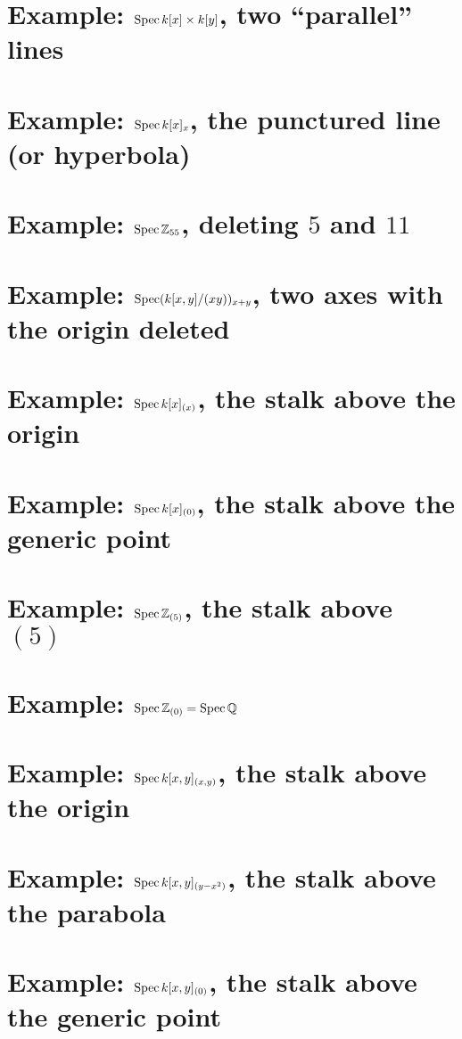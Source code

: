 \section{Example: $\operatorname{Spec} k[x] \times k[y]$, two ``parallel'' lines}

\section{Example: $\operatorname{Spec} k[x]_x$, the punctured line (or hyperbola)}
\section{Example: $\operatorname{Spec} \mathbb Z_{55}$, deleting $5$ and $11$}

\section{Example: $\operatorname{Spec} (k[x,y]/(xy))_{x+y}$, two axes with the origin deleted}

\section{Example: $\operatorname{Spec} k[x]_{(x)}$, the stalk above the origin}
\section{Example: $\operatorname{Spec} k[x]_{(0)}$, the stalk above the generic point}
\section{Example: $\operatorname{Spec} \mathbb Z_{(5)}$, the stalk above $(5)$}
\section{Example: $\operatorname{Spec} \mathbb Z_{(0)} = \operatorname{Spec} \mathbb Q$}
\section{Example: $\operatorname{Spec} k[x,y]_{(x,y)}$, the stalk above the origin}
\section{Example: $\operatorname{Spec} k[x,y]_{(y-x^2)}$, the stalk above the parabola}
\section{Example: $\operatorname{Spec} k[x,y]_{(0)}$, the stalk above the generic point}


